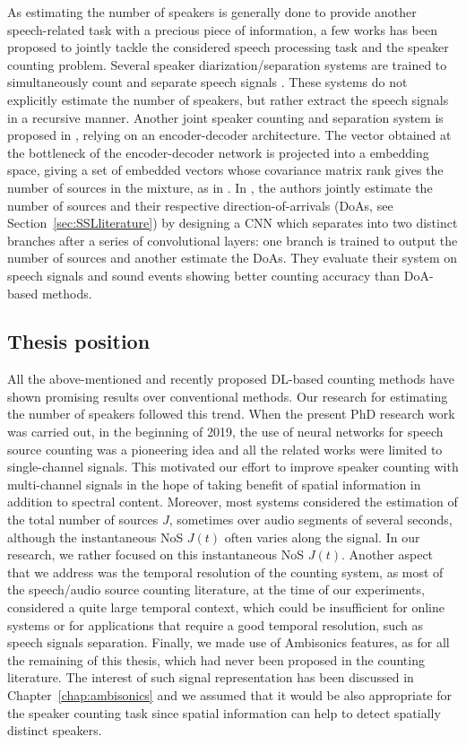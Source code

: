 As estimating the number of speakers is generally done to provide another speech-related task with a precious piece of information, a few works has been proposed to jointly tackle the considered speech processing task and the speaker counting problem. Several speaker diarization/separation systems are trained to simultaneously count and separate speech signals \cite{von_neumann_all-neural_2019,kinoshita_tackling_2020}. These systems do not explicitly estimate the number of speakers, but rather extract the speech signals in a recursive manner. Another joint speaker counting and separation system is proposed in \cite{xiao_improved_2020}, relying on an encoder-decoder architecture. The vector obtained at the bottleneck of the encoder-decoder network is projected into a embedding space, giving a set of embedded vectors whose covariance matrix rank gives the number of sources in the mixture, as in \cite{peng_competing_2020}. In \cite{nguyen_robust_2020}, the authors jointly estimate the number of sources and their respective direction-of-arrivals (DoAs, see Section~\ref{sec:SSLliterature}) by designing a CNN which separates into two distinct branches after a series of convolutional layers: one branch is trained to output the number of sources and another estimate the DoAs. They evaluate their system on speech signals and sound events showing better counting accuracy than DoA-based methods. 


\subsection{Thesis position}

All the above-mentioned and recently proposed DL-based counting methods have shown promising results over conventional methods. Our research for estimating the number of speakers followed this trend. When the present PhD research work was carried out, in the beginning of 2019, the use of neural networks for speech source counting was a pioneering idea and all the related works were limited to single-channel signals. This motivated our effort to improve speaker counting with multi-channel signals in the hope of taking benefit of spatial information in addition to spectral content. Moreover, most systems considered the estimation of the total number of sources $J$, sometimes over audio segments of several seconds, although the instantaneous NoS $J(t)$ often varies along the signal. In our research, we rather focused on this instantaneous NoS $J(t)$. Another aspect that we address was the temporal resolution of the counting system, as most of the speech/audio source counting literature, at the time of our experiments, considered a quite large temporal context, which could be insufficient for online systems or for applications that require a good temporal resolution, such as speech signals separation. Finally, we made use of Ambisonics features, as for all the remaining of this thesis, which had never been proposed in the counting literature. The interest of such signal representation has been discussed in Chapter~\ref{chap:ambisonics} and we assumed that it would be also appropriate for the speaker counting task since spatial information can help to detect spatially distinct speakers.

